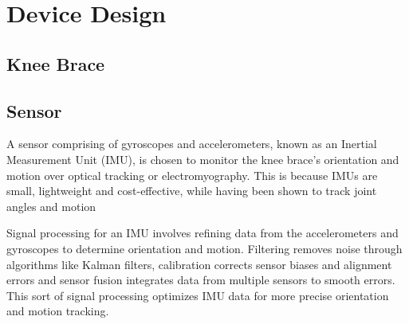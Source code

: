 \documentclass[main.tex]{subfiles}
\begin{document}
\section{Device Design}

\subsection{Knee Brace}

\subsection{Sensor}

A sensor comprising of gyroscopes and accelerometers, known as an Inertial Measurement Unit (IMU), is chosen to monitor the knee brace's orientation and motion over optical tracking or electromyography.
This is because IMUs are small, lightweight and cost-effective, while having been shown to track joint angles and motion

Signal processing for an IMU involves refining data from the accelerometers and gyroscopes to determine orientation and motion.
Filtering removes noise through algorithms like Kalman filters, calibration corrects sensor biases and alignment errors and sensor fusion integrates data from multiple sensors to smooth errors.
This sort of signal processing optimizes IMU data for more precise orientation and motion tracking.

\subsection{}






\ifSubfilesClassLoaded{%
	\printbibliography{}
}{}
\end{document}
